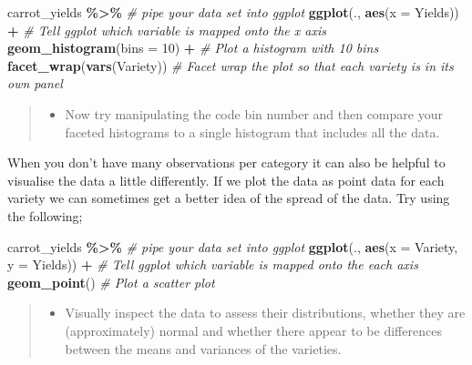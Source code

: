 \documentclass[
]{book}
\newenvironment{Shaded}{\begin{snugshade}}{\end{snugshade}}
\newcommand{\AttributeTok}[1]{\textcolor[rgb]{0.13,0.29,0.53}{#1}}
\newcommand{\CommentTok}[1]{\textcolor[rgb]{0.56,0.35,0.01}{\textit{#1}}}
\newcommand{\DecValTok}[1]{\textcolor[rgb]{0.00,0.00,0.81}{#1}}
\newcommand{\FunctionTok}[1]{\textcolor[rgb]{0.13,0.29,0.53}{\textbf{#1}}}
\newcommand{\NormalTok}[1]{#1}
\newcommand{\SpecialCharTok}[1]{\textcolor[rgb]{0.81,0.36,0.00}{\textbf{#1}}}
\providecommand{\tightlist}{%
  \setlength{\itemsep}{0pt}\setlength{\parskip}{0pt}}
\begin{document}
\begin{Shaded}
\begin{Highlighting}[]
\NormalTok{carrot\_yields }\SpecialCharTok{\%\textgreater{}\%} \CommentTok{\# pipe your data set into ggplot}
  \FunctionTok{ggplot}\NormalTok{(., }\FunctionTok{aes}\NormalTok{(}\AttributeTok{x =}\NormalTok{ Yields)) }\SpecialCharTok{+} \CommentTok{\# Tell ggplot which variable is mapped onto the x axis}
  \FunctionTok{geom\_histogram}\NormalTok{(}\AttributeTok{bins =} \DecValTok{10}\NormalTok{) }\SpecialCharTok{+} \CommentTok{\# Plot a histogram with 10 bins}
  \FunctionTok{facet\_wrap}\NormalTok{(}\FunctionTok{vars}\NormalTok{(Variety)) }\CommentTok{\# Facet wrap the plot so that each variety is in its own panel}
\end{Highlighting}
\end{Shaded}

\begin{quote}
\begin{itemize}
\tightlist
\item
  Now try manipulating the code bin number and then compare your faceted histograms to a single histogram that includes all the data.
\end{itemize}
\end{quote}

When you don't have many observations per category it can also be helpful to visualise the data a little differently. If we plot the data as point data for each variety we can sometimes get a better idea of the spread of the data. Try using the following;

\begin{Shaded}
\begin{Highlighting}[]
\NormalTok{carrot\_yields }\SpecialCharTok{\%\textgreater{}\%} \CommentTok{\# pipe your data set into ggplot}
  \FunctionTok{ggplot}\NormalTok{(., }\FunctionTok{aes}\NormalTok{(}\AttributeTok{x =}\NormalTok{ Variety, }\AttributeTok{y =}\NormalTok{ Yields)) }\SpecialCharTok{+} \CommentTok{\# Tell ggplot which variable is mapped onto the each axis}
  \FunctionTok{geom\_point}\NormalTok{() }\CommentTok{\# Plot a scatter plot}
\end{Highlighting}
\end{Shaded}

\begin{quote}
\begin{itemize}
\tightlist
\item
  Visually inspect the data to assess their distributions, whether they are (approximately) normal and whether there appear to be differences between the means and variances of the varieties.
\end{itemize}
\end{quote}
\end{document}
